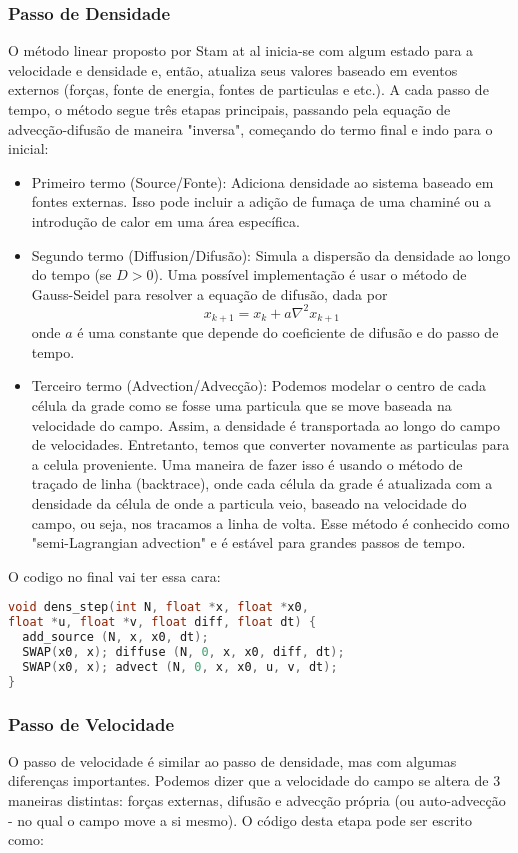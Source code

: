 \subsubsection{Passo de Densidade}
O método linear proposto por Stam at al \cite{Stam2003} inicia-se com algum estado para a velocidade e densidade e, então, atualiza seus valores baseado em eventos externos (forças, fonte de energia, fontes de particulas e etc.). A cada passo de tempo, o método segue três etapas principais, passando pela equação de advecção-difusão de maneira "inversa", começando do termo final e indo para o inicial:

\begin{itemize}
  \item Primeiro termo (Source/Fonte): Adiciona densidade ao sistema baseado em fontes externas. Isso pode incluir a adição de fumaça de uma chaminé ou a introdução de calor em uma área específica.
  \item Segundo termo (Diffusion/Difusão): Simula a dispersão da densidade ao longo do tempo (se $D > 0$). Uma possível implementação é usar o método de Gauss-Seidel para resolver a equação de difusão, dada por 
    $$
    x_{k+1} = x_k + a \nabla^2 x_{k+1}
    $$
    onde $a$ é uma constante que depende do coeficiente de difusão e do passo de tempo.
  \item Terceiro termo (Advection/Advecção): Podemos modelar o centro de cada célula da grade como se fosse uma particula que se move baseada na velocidade do campo. Assim, a densidade é transportada ao longo do campo de velocidades. Entretanto, temos que converter novamente as particulas para a celula proveniente. Uma maneira de fazer isso é usando o método de traçado de linha (backtrace), onde cada célula da grade é atualizada com a densidade da célula de onde a particula veio, baseado na velocidade do campo, ou seja, nos tracamos a linha de volta. Esse método é conhecido como "semi-Lagrangian advection" e é estável para grandes passos de tempo.

\end{itemize}

O codigo no final vai ter essa cara:
\begin{lstlisting}[language=C]
void dens_step(int N, float *x, float *x0, 
float *u, float *v, float diff, float dt) {
  add_source (N, x, x0, dt);
  SWAP(x0, x); diffuse (N, 0, x, x0, diff, dt);
  SWAP(x0, x); advect (N, 0, x, x0, u, v, dt);
}
\end{lstlisting}

\subsubsection{Passo de Velocidade}
O passo de velocidade é similar ao passo de densidade, mas com algumas diferenças importantes. Podemos dizer que a velocidade do campo se altera de 3 maneiras distintas: forças externas, difusão e advecção própria (ou auto-advecção - no qual o campo move a si mesmo). O código desta etapa pode ser escrito como:

